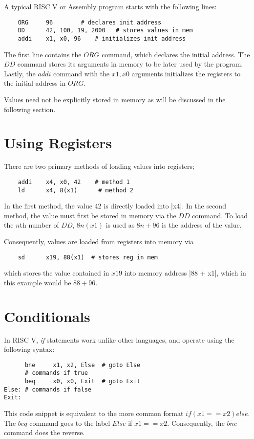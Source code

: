 \documentclass[oneside,11pt]{book}
\begin{document}
A typical RISC V or Assembly program starts with the following lines:
\begin{verbatim}
	ORG     96		  # declares init address
	DD      42, 100, 19, 2000   # stores values in mem
	addi    x1, x0, 96	  # initializes init address
\end{verbatim}
The first line contains the \cverb$ORG$ command, which declares the initial address. The \cverb$DD$ command stores its arguments in memory to be later used by the program. Lastly, the \cverb$addi$ command with the \cverb$x1, x0$ arguments initializes the registers to the initial address in \cverb$ORG$.

\bigskip
Values need not be explicitly stored in memory as will be discussed in the following section.

\section{Using Registers}
There are two primary methods of loading values into registers;
\begin{verbatim}
	addi    x4, x0, 42	  # method 1
	ld      x4, 8(x1)	   # method 2
\end{verbatim}
In the first method, the value 42 is directly loaded into \cverb|x4|. In the second method, the value must first be stored in memory via the \cverb$DD$ command. To load the $n$th number of \cverb$DD$, \cverb$8n(x1)$ is used as $8n + 96$ is the address of the value.

\bigskip
Consequently, values are loaded from registers into memory via
\begin{verbatim}
	sd      x19, 88(x1)	 # stores reg in mem
\end{verbatim}
which stores the value contained in \cverb$x19$ into memory address \cverb|88 + x1|, which in this example would be $88 + 96$.

\section{Conditionals}
In RISC V, \textit{if} statements work unlike other languages, and operate using the following syntax:
\begin{verbatim}
      bne     x1, x2, Else	# goto Else
      # commands if true
      beq     x0, x0, Exit	# goto Exit
Else: # commands if false
Exit:
\end{verbatim}
This code snippet is equivalent to the more common format \cverb$if (x1 == x2) {} else {}$. The \cverb$beq$ command goes to the label \cverb$Else$ if \cverb$x1 == x2$. Consequently, the \cverb$bne$ command does the reverse.
\end{document}
